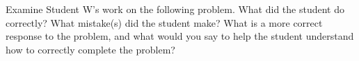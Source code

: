 \documentclass[12pt,letterpaper]{hmcpset}
\begin{document}
\begin{problem}[5]
  Examine Student W's work on the following problem.  What did the student do correctly?  What mistake(s) did the student make?  What is a more correct response to the problem, and what would you say to help the student understand how to correctly complete the problem?

  \begin{center}
  \end{center}
  \hspace{10pt}
\end{problem}

\begin{solution}
\vfill
\end{solution}
\newpage
\end{document}
